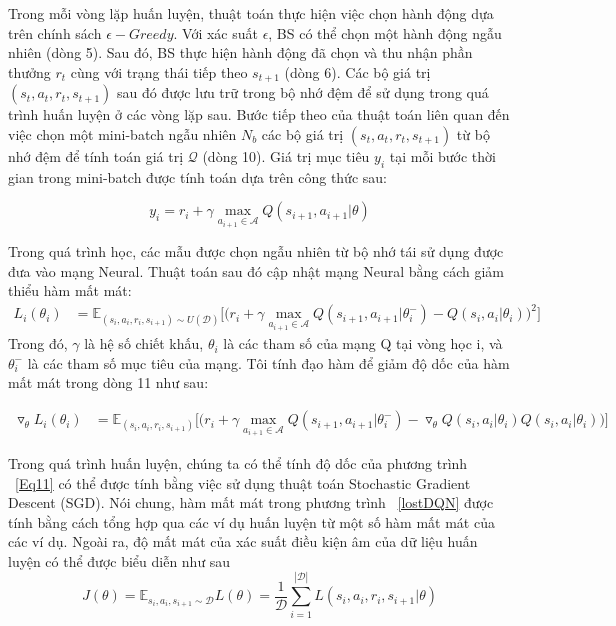 \documentclass{article} %
\begin{document}
Trong mỗi vòng lặp huấn luyện, thuật toán thực hiện việc chọn hành động dựa trên chính sách $\epsilon-Greedy$. Với xác suất $\epsilon$, BS có thể chọn một hành động ngẫu nhiên (dòng 5). Sau đó, BS thực hiện hành động đã chọn và thu nhận phần thưởng $r_t$ cùng với trạng thái tiếp theo $s_{t+1}$ (dòng 6). Các bộ giá trị $\left(s_t,a_t,r_t,s_{t+1}\right)$ sau đó được lưu trữ trong bộ nhớ đệm để sử dụng trong quá trình huấn luyện ở các vòng lặp sau.
Bước tiếp theo của thuật toán liên quan đến việc chọn một mini-batch ngẫu nhiên $N_b$ các bộ giá trị $\left(s_t,a_t,r_t,s_{t+1}\right)$ từ bộ nhớ đệm để tính toán giá trị $\mathcal{Q}$ (dòng 10). Giá trị mục tiêu $y_i$ tại mỗi bước thời gian trong mini-batch được tính toán dựa trên công thức sau:

\begin{equation}
y_i = r_i+ \gamma \underset{a_{i+1} \in \mathbf{\mathcal{A} }}{\mathop{\mathrm{max}}}Q(s_{i+1},a_{i+1}|\theta)
\end{equation}


Trong quá trình học, các mẫu được chọn ngẫu nhiên từ bộ nhớ tái sử dụng được đưa vào mạng Neural. Thuật toán sau đó cập nhật mạng Neural bằng cách giảm thiểu hàm mất mát:
\begin{equation}\label{lostDQN}
\begin{split}
    L_i(\theta_i) &= \mathbb{E}_{(s_i,a_i,r_i, s_{i+1}) \sim U(\mathcal{D})} \Big[\Big(r_i+\gamma \underset{a_{i+1} \in \mathbf{\mathcal{A} }}{\mathop{\mathrm{max}}}Q(s_{i+1},a_{i+1}|\theta_i^-)-Q(s_{i},a_{i}|\theta_i)\Big)^2\Big]
\end{split}
\end{equation}
Trong đó, $\gamma$ là hệ số chiết khấu, $\theta_i$ là các tham số của mạng Q tại vòng học i, và $\theta_i^-$ là các tham số mục tiêu của mạng. Tôi tính đạo hàm để giảm độ dốc của hàm mất mát trong dòng 11 như sau:

\begin{equation}\label{Eq11}
\begin{split}
    \triangledown_{\theta}L_i(\theta_i) &= \mathbb{E}_{(s_i,a_i,r_i, s_{i+1})} \Big[\Big(r_i+
    \gamma \underset{a_{i+1} \in \mathbf{\mathcal{A} }}{\mathop{\mathrm{max}}}Q(s_{i+1},a_{i+1}|\theta_i^-)-\triangledown_{\theta}Q(s_{i},a_{i}|\theta_i) Q(s_{i},a_{i}|\theta_i)\Big)\Big]
\end{split}
\end{equation}


Trong quá trình huấn luyện, chúng ta có thể tính độ dốc của phương trình ~\eqref{Eq11} có thể được tính bằng việc sử dụng thuật toán Stochastic Gradient Descent (SGD). Nói chung, hàm mất mát trong phương trình ~\eqref{lostDQN} được tính bằng cách tổng hợp qua các ví dụ huấn luyện từ một số hàm mất mát của các ví dụ. Ngoài ra, độ mất mát của xác suất điều kiện âm của dữ liệu huấn luyện có thể được biểu diễn như sau\begin{equation}\label{Eq12}
    J(\theta) = \mathbb{E}_{{s_i,a_i,s_{i+1}} \sim \mathcal{D}}L(\theta)= \frac{1}{\mathcal{D}}\sum^{|\mathcal{D}|}_{i = 1}L(s_i,a_i,r_i,s_{i+1}|\theta)
\end{equation}
\end{document}
